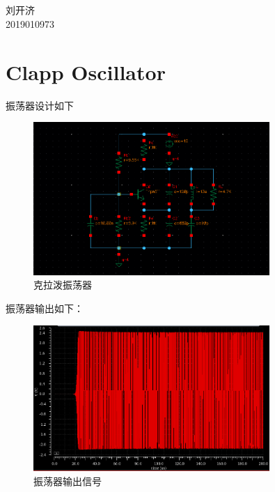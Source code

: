 \documentclass[12pt, a4paper]{article}
\begin{document}
	\begin{center}
		\vspace{0.2in}
		 \\ [12pt]
		  \\ [12pt]
		{\fontsize{14pt}{1.2em}\selectfont
			刘开济\\ [10pt]
			2019010973 \\ [10pt]
		}
	\end{center}
    \section{Clapp Oscillator}
    振荡器设计如下
        \begin{figure}[H]
    	\centering
    	\includegraphics[width = 0.8\textwidth]{clapper-circ}
    	\caption{克拉泼振荡器}
    \end{figure}\par
    振荡器输出如下：
     \begin{figure}[H]
    	\centering
    	\includegraphics[width = 0.8\textwidth]{clapper-osc}
    	\caption{振荡器输出信号}
    \end{figure}\par
\end{document}
